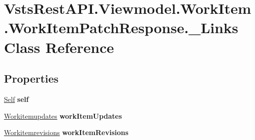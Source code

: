 \hypertarget{class_vsts_rest_a_p_i_1_1_viewmodel_1_1_work_item_1_1_work_item_patch_response_1_1___links}{}\section{Vsts\+Rest\+A\+P\+I.\+Viewmodel.\+Work\+Item.\+Work\+Item\+Patch\+Response.\+\_\+\+Links Class Reference}
\label{class_vsts_rest_a_p_i_1_1_viewmodel_1_1_work_item_1_1_work_item_patch_response_1_1___links}
\subsection*{Properties}
\begin{DoxyCompactItemize}
\item 
\mbox{\label{class_vsts_rest_a_p_i_1_1_viewmodel_1_1_work_item_1_1_work_item_patch_response_1_1___links_aa993e17cfb2c362e7ef0f78895d6de1d}} 
\mbox{\hyperlink{class_vsts_rest_a_p_i_1_1_viewmodel_1_1_work_item_1_1_work_item_patch_response_1_1_self}{Self}} {\bfseries self}
\item 
\mbox{\label{class_vsts_rest_a_p_i_1_1_viewmodel_1_1_work_item_1_1_work_item_patch_response_1_1___links_ac04306e846f461282053d664e0849e7c}} 
\mbox{\hyperlink{class_vsts_rest_a_p_i_1_1_viewmodel_1_1_work_item_1_1_work_item_patch_response_1_1_workitemupdates}{Workitemupdates}} {\bfseries work\+Item\+Updates}
\item 
\mbox{\label{class_vsts_rest_a_p_i_1_1_viewmodel_1_1_work_item_1_1_work_item_patch_response_1_1___links_aac79ea3367d4da870fbac1f7cac5cf3f}} 
\mbox{\hyperlink{class_vsts_rest_a_p_i_1_1_viewmodel_1_1_work_item_1_1_work_item_patch_response_1_1_workitemrevisions}{Workitemrevisions}} {\bfseries work\+Item\+Revisions}

\end{DoxyCompactItemize}
